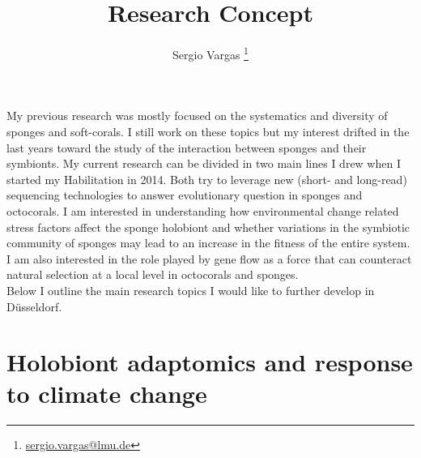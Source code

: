 \documentclass[a4paper,11pt]{article}
\makeatletter
\renewcommand{\maketitle}{\bgroup\setlength{\parindent}{0pt}
\begin{flushleft}
  \thispagestyle{plain}
  \textbf{\@title}

  \@author
\end{flushleft}\egroup
}
\renewenvironment{abstract}
 {\small
  \begin{flushleft}
  \textbf{\abstractname}\vspace{-0.40em}\vspace{0pt}
  \end{flushleft}
  \list{}{
    \setlength{\leftmargin}{0cm}%
    \setlength{\rightmargin}{\leftmargin}%
  }%
  \item\relax}
 {\endlist}
\makeatother
\begin{document}
\title{\Large Research Concept\newline}

\author[1]{Sergio Vargas \footnote[2]{\href{sergio.vargas@lmu.de}{sergio.vargas@lmu.de}}}


\date{}

\maketitle


My previous research was mostly focused on the systematics and diversity of sponges and soft-corals. I still work on these topics but my interest drifted in the last years toward the study of the interaction between sponges and their symbionts. My current research can be divided in two main lines I drew when I started my Habilitation in 2014. Both try to leverage new (short- and long-read) sequencing technologies to answer evolutionary question in sponges and octocorals. I am interested in understanding how environmental change related stress factors affect the sponge holobiont and whether variations in the symbiotic community of sponges may lead to an increase in the fitness of the entire system. I am also interested in the role played by gene flow as a force that can counteract natural selection at a local level in octocorals and sponges.\\

Below I outline the main research topics I would like to further develop in D\"usseldorf.

\section*{Holobiont adaptomics and response to climate change}
\end{document}
